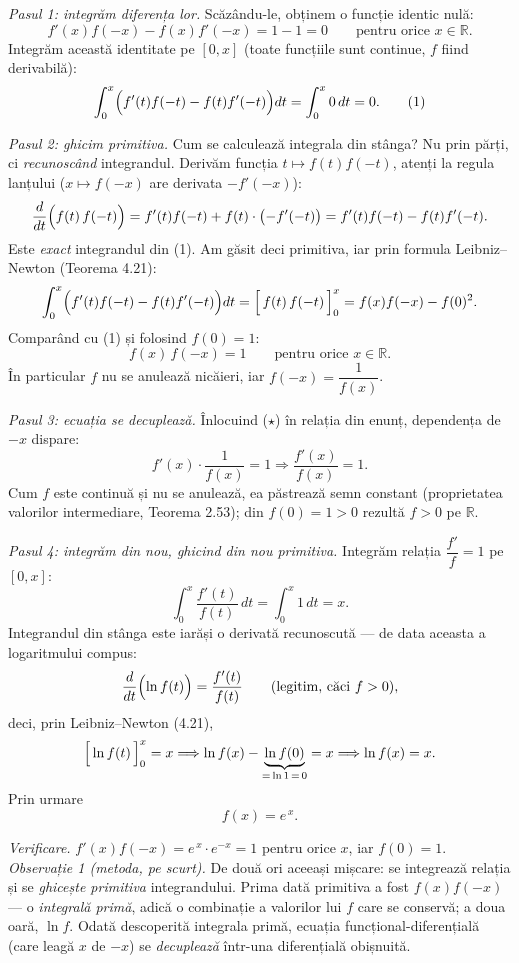 \emph{Pasul 1: integrăm diferența lor.} Scăzându-le, obținem o funcție identic nulă:
\[ f'(x)f(-x)-f(x)f'(-x)=1-1=0\qquad\text{pentru orice }x\in\mathbb{R} . \]
Integrăm această identitate pe $[0,x]$ (toate funcțiile sunt continue, $f$ fiind derivabilă):
\[ \int_{0}^{x}\Bigl(f'(t)f(-t)-f(t)f'(-t)\Bigr)dt=\int_{0}^{x}0\,dt=0 . \tag{1} \]

\emph{Pasul 2: ghicim primitiva.} Cum se calculează integrala din stânga? Nu prin părți, ci \emph{recunoscând} integrandul. Derivăm funcția $t\mapsto f(t)f(-t)$, atenți la regula lanțului ($x\mapsto f(-x)$ are derivata $-f'(-x)$):
\[ \frac{d}{dt}\Bigl(f(t)\,f(-t)\Bigr)=f'(t)f(-t)+f(t)\cdot\bigl(-f'(-t)\bigr)=f'(t)f(-t)-f(t)f'(-t) . \]
Este \emph{exact} integrandul din (1). Am găsit deci primitiva, iar prin formula Leibniz--Newton (Teorema 4.21):
\[ \int_{0}^{x}\Bigl(f'(t)f(-t)-f(t)f'(-t)\Bigr)dt=\Bigl[\,f(t)\,f(-t)\,\Bigr]_{0}^{x}=f(x)f(-x)-f(0)^{2} . \]
Comparând cu (1) și folosind $f(0)=1$:
\[ f(x)\,f(-x)=1\qquad\text{pentru orice }x\in\mathbb{R} . \tag{$\star$} \]
În particular $f$ nu se anulează nicăieri, iar $f(-x)=\dfrac{1}{f(x)}$.

\emph{Pasul 3: ecuația se decuplează.} Înlocuind ($\star$) în relația din enunț, dependența de $-x$ dispare:
\[ f'(x)\cdot\frac{1}{f(x)}=1 \Longrightarrow \frac{f'(x)}{f(x)}=1 . \]
Cum $f$ este continuă și nu se anulează, ea păstrează semn constant (proprietatea valorilor intermediare, Teorema 2.53); din $f(0)=1>0$ rezultă $f>0$ pe $\mathbb{R}$.

\emph{Pasul 4: integrăm din nou, ghicind din nou primitiva.} Integrăm relația $\dfrac{f'}{f}=1$ pe $[0,x]$:
\[ \int_{0}^{x}\frac{f'(t)}{f(t)}\,dt=\int_{0}^{x}1\,dt=x . \]
Integrandul din stânga este iarăși o derivată recunoscută --- de data aceasta a logaritmului compus:
\[ \frac{d}{dt}\Bigl(\ln f(t)\Bigr)=\frac{f'(t)}{f(t)}\qquad(\text{legitim, căci }f>0) , \]
deci, prin Leibniz--Newton (4.21),
\[ \Bigl[\,\ln f(t)\,\Bigr]_{0}^{x}=x \Longrightarrow \ln f(x)-\underbrace{\ln f(0)}_{=\,\ln 1\,=\,0}=x \Longrightarrow \ln f(x)=x . \]
Prin urmare
\[ f(x)=e^{\,x} . \]

\emph{Verificare.} $f'(x)f(-x)=e^{\,x}\cdot e^{-x}=1$ pentru orice $x$, iar $f(0)=1$. \checkmark\\[2pt]
\emph{Observație 1 (metoda, pe scurt).} De două ori aceeași mișcare: se integrează relația și se \emph{ghicește primitiva} integrandului. Prima dată primitiva a fost $f(x)f(-x)$ --- o \emph{integrală primă}, adică o combinație a valorilor lui $f$ care se conservă; a doua oară, $\ln f$. Odată descoperită integrala primă, ecuația funcțional-diferențială (care leagă $x$ de $-x$) se \emph{decuplează} într-una diferențială obișnuită.


